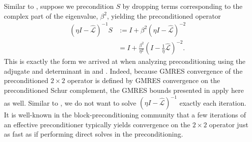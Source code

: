 \documentclass[review]{siamart}
\begin{document}
Similar to , suppose we precondition $S$ by dropping
terms corresponding to the complex part of the eigenvalue, $\beta^2$, yielding the
preconditioned operator
%
\begin{align}\nonumber
(\eta I - \widehat{\mathcal{L}})^{-1}S &
	:= I + \beta^2 (\eta I - \widehat{\mathcal{L}})^{-2}\\
& = I + \frac{\beta^2}{\eta^2} (I - \tfrac{1}{\eta}\widehat{\mathcal{L}})^{-2}.
\label{eq:prec2}
\end{align}
%
This is exactly the form we arrived at when analyzing preconditioning using the
adjugate and determinant in  and . Indeed, because
GMRES convergence of the preconditioned $2\times 2$ operator is defined by GMRES
convergence on the preconditioned Schur complement, the GMRES bounds presented
in  apply here as well. Similar to , we do not
want to solve $(\eta I - \widehat{\mathcal{L}})^{-1}$ exactly each iteration. It
is well-known in the block-preconditioning community that a few iterations of
an effective preconditioner typically yields convergence on the $2\times 2$
operator just as fast as if performing direct solves in the preconditioning. 
\end{document}
